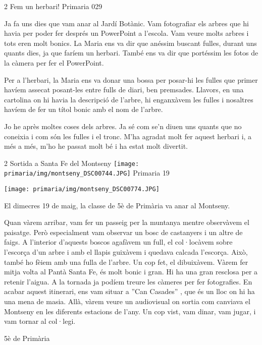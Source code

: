 \newssep
{}

\begin{news}
{2} %
{Fem un herbari!}
{}
{Primaria}
{029} %


Ja fa uns dies que vam anar al Jardí Botànic. Vam fotografiar els arbres que hi havia per poder fer després un PowerPoint a l’escola. Vam veure molts arbres i tots eren molt bonics. 
La Maria ens va dir que anéssim buscant fulles, durant uns quants dies, ja que faríem un herbari. També ens va dir que portéssim les fotos de la càmera per fer el PowerPoint. 

Per a l’herbari, la Maria ens va donar una bossa per posar-hi les fulles que primer havíem assecat posant-les entre fulls de diari, ben premsades. Llavors, en una cartolina on hi havia la descripció de l’arbre, hi enganxàvem les fulles i nosaltres havíem de fer un títol bonic amb el nom de l’arbre.

Jo he après moltes coses dels arbres. Ja sé com se’n diuen uns quants que no coneixia i com són les fulles i el tronc. M’ha agradat molt fer aquest herbari i, a més a més, m’ho he passat molt bé i ha estat molt divertit.


\end{news}

\begin{news}
{2} %
{Sortida a Santa Fe del Montseny}
{\noindent\texttt{[image: primaria/img/montseny\_DSC00744.JPG]}}
{Primaria}
{19} %

{\noindent\texttt{[image: primaria/img/montseny\_DSC00774.JPG]}}

El dimecres 19 de maig,  la classe de 5è de Primària va anar al Montseny.

Quan vàrem arribar, vam fer un passeig per la muntanya mentre observàvem el paisatge. Però especialment vam observar un bosc de castanyers i un altre de faigs. A l’interior d’aquests boscos agafàvem un full, el col·locàvem sobre l’escorça d’un arbre i amb el llapis guixàvem i quedava calcada l’escorça. Això, també ho fèiem amb una fulla de l’arbre. Un cop fet, el dibuixàvem. Vàrem fer mitja volta al Pantà Santa Fe, és molt bonic i gran. Hi ha una gran resclosa per a retenir l’aigua. A la tornada ja podíem treure les càmeres per  fer fotografies. En acabar aquest itinerari, ens vam situar a ”Can Casades” , que és un lloc on hi ha una mena de masia. Allà, vàrem veure un audiovisual on sortia com canviava el Montseny en les diferents estacions de l’any. Un cop vist, vam dinar, vam jugar, i vam tornar al col·legi.  

{5è de Primària}

\end{news}

